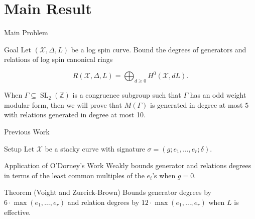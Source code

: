 \documentclass{beamer}
\theoremstyle{remark}
\newcommand\BZ{{\mathbb Z}}
\newcommand \sx{{\mathscr X}}
\newcommand{\halfcan}{L}
\newcommand{\SL}{\operatorname{SL}}
\begin{document}
\section{Main Result}

\begin{frame}{Main Problem}

\begin{block}{Goal}
Let $(\sx, \Delta, \halfcan)$ be a log spin curve.
Bound the degrees of generators and relations of log spin
canonical rings

\[
	R(\sx, \Delta, \halfcan) = \bigoplus_{d \geq 0} H^0(\sx, d \halfcan).
\]
\end{block}

\begin{example}
When $\Gamma \subseteq \SL_2(\BZ)$ is a congruence subgroup such that $\Gamma$ has an odd weight modular form, then we will prove that $M(\Gamma)$ is generated in degree at most 5 with relations generated in degree at most 10.
\end{example}

\end{frame}


\begin{frame}{Previous Work}

\begin{block}{Setup}
Let $\sx$ be a stacky curve with
signature $\sigma = (g; e_1, \ldots, e_r; \delta)$.
\end{block}


\begin{block}{Application of O'Dorney's Work}
Weakly bounds generator and relations degrees in terms of
the least common multiples of the $e_i$'s when $g = 0$.
\end{block}

\begin{block}{Theorem (Voight and Zureick-Brown)}
Bounds generator degrees by $6
\cdot \max(e_1, \ldots, e_r)$ and relation degrees by $12 \cdot \max
(e_1, \ldots, e_ r)$ when $\halfcan$ is effective.
\end{block}

\end{frame}
\end{document}
